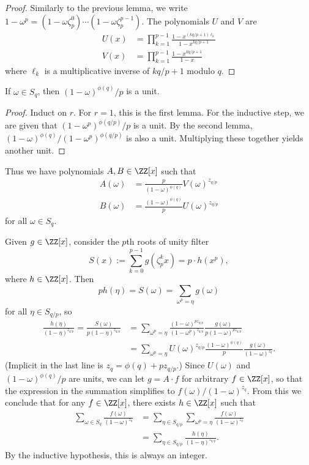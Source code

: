 \documentclass[11pt]{scrartcl}
\begin{document}
\begin{proof}
  Similarly to the previous lemma, we write $1-\omega^p =
  (1-\omega\zeta_p^0)\dotsm(1-\omega\zeta_p^{p-1})$. The polynomials $U$ and $V$
  are
  \begin{align*}
    U(x) &= \prod_{k=1}^{p-1}\frac{1-x^{(kq/p+1)\ell_k}}{1-x^{kq/p+1}} \\
    V(x) &= \prod_{k=1}^{p-1}\frac{1-x^{kq/p+1}}{1-x}
  \end{align*}
  where $\ell_k$ is a multiplicative inverse of $kq/p+1$ modulo $q$.
\end{proof}

\begin{corollary*}
  If $\omega\in S_q$, then $(1-\omega)^{\phi(q)}/p$ is a unit.
\end{corollary*}

\begin{proof}
  Induct on $r$. For $r=1$, this is the first lemma. For the inductive step,
we are given that $(1-\omega^p)^{\phi(q/p)}/p$ is a unit. By the second lemma,
$(1-\omega)^{\phi(q)}/(1-\omega^p)^{\phi(q/p)}$ is also a unit. Multiplying
these together yields another unit.
\end{proof}

Thus we have polynomials $A, B\in \ZZ[x]$ such that
\begin{align*}
  A(\omega) &= \frac{p}{(1-\omega)^{\phi(q)}}V(\omega)^{z_{q/p}} \\
  B(\omega) &= \frac{(1-\omega)^{\phi(q)}}{p}U(\omega)^{z_{q/p}}
\end{align*}
for all $\omega\in S_q$.

Given $g\in \ZZ[x]$, consider the $p$th roots of unity filter \[S(x) :=
\sum_{k=0}^{p-1} g(\zeta_p^k x) = p\cdot h(x^p),\] where $h\in \ZZ[x]$.
Then \[ph(\eta) = S(\omega) = \sum_{\omega^p = \eta} g(\omega)\] for all $\eta\in
S_{q/p}$, so
\begin{align*}
\frac{h(\eta)}{(1-\eta)^{z_{q/p}}}
= \frac{S(\omega)}{p(1-\eta)^{z_{q/p}}}
&= \sum_{\omega^p = \eta} \frac{(1-\omega)^{pz_{q/p}}}{(1-\omega^p)^{z_{q/p}}} \frac{g(\omega)}{p(1-\omega)^{pz_{q/p}}} \\
&= \sum_{\omega^p = \eta}
U(\omega)^{z_{q/p}}\frac{(1-\omega)^{\phi(q)}}{p}\frac{g(\omega)}{(1-\omega)^{z_q}}.
\end{align*}
(Implicit in the last line is $z_q=\phi(q)+pz_{q/p}$.)
Since $U(\omega)$ and $(1-\omega)^{\phi(q)}/p$ are units, we can let $g=A\cdot
f$ for arbitrary $f\in \ZZ[x]$, so that the expression in the summation
simplifies to $f(\omega)/(1-\omega)^{z_q}$.
From this we conclude that for any $f\in \ZZ[x]$, there exists $h\in
\ZZ[x]$ such that
\begin{align*}
  \sum_{\omega\in S_q}\frac{f(\omega)}{(1-\omega)^{z_q}} &= \sum_{\eta\in
  S_{q/p}}\sum_{\omega^p=\eta}\frac{f(\omega)}{(1-\omega)^{z_q}} \\
                                                         &= \sum_{\eta\in
                                                         S_{q/p}}\frac{h(\eta)}{(1-\eta)^{z_{q/p}}}.
\end{align*}
By the inductive hypothesis, this is always an integer.
\end{document}
